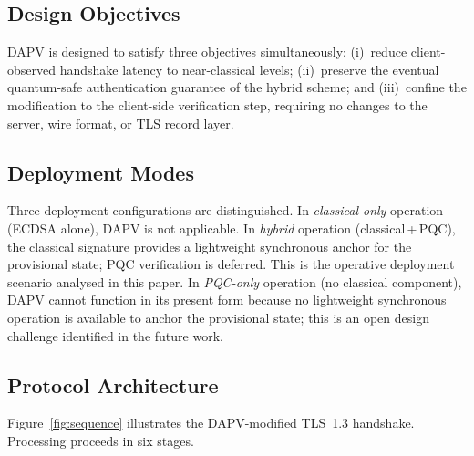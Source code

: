 \documentclass[preprint,10pt,3p]{elsarticle}
\begin{document}
\subsection{Design Objectives}

DAPV is designed to satisfy three objectives simultaneously: (i)~reduce
client-observed handshake latency to near-classical levels; (ii)~preserve the
eventual quantum-safe authentication guarantee of the hybrid scheme; and
(iii)~confine the modification to the client-side verification step, requiring
no changes to the server, wire format, or TLS record layer.

\subsection{Deployment Modes}
\label{sec:modes}

Three deployment configurations are distinguished.  In \textit{classical-only}
operation (ECDSA alone), DAPV is not applicable.  In \textit{hybrid} operation
(classical\,+\,PQC), the classical signature provides a lightweight synchronous
anchor for the provisional state; PQC verification is deferred.  This is the
operative deployment scenario analysed in this paper.  In \textit{PQC-only}
operation (no classical component), DAPV cannot function in its present form
because no lightweight synchronous operation is available to anchor the
provisional state; this is an open design challenge identified in the future
work.

\subsection{Protocol Architecture}
\label{sec:protocol}

Figure~\ref{fig:sequence} illustrates the DAPV-modified TLS~1.3 handshake.
Processing proceeds in six stages.
\end{document}

